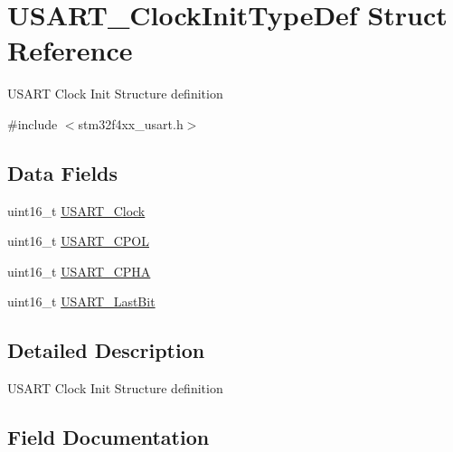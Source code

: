 \hypertarget{struct_u_s_a_r_t___clock_init_type_def}{}\section{U\+S\+A\+R\+T\+\_\+\+Clock\+Init\+Type\+Def Struct Reference}
\label{struct_u_s_a_r_t___clock_init_type_def}


U\+S\+A\+RT Clock Init Structure definition ~\newline
  




{\ttfamily \#include $<$stm32f4xx\+\_\+usart.\+h$>$}

\subsection*{Data Fields}
\begin{DoxyCompactItemize}
\item 
uint16\+\_\+t \mbox{\hyperlink{struct_u_s_a_r_t___clock_init_type_def_a17b0a201922d9d4bad57583b9766904a}{U\+S\+A\+R\+T\+\_\+\+Clock}}
\item 
uint16\+\_\+t \mbox{\hyperlink{struct_u_s_a_r_t___clock_init_type_def_ab6507c7489a2e05e4ef1ade9fbf057d5}{U\+S\+A\+R\+T\+\_\+\+C\+P\+OL}}
\item 
uint16\+\_\+t \mbox{\hyperlink{struct_u_s_a_r_t___clock_init_type_def_ae8d00e2e6f99439097a1b56cd33dd9f4}{U\+S\+A\+R\+T\+\_\+\+C\+P\+HA}}
\item 
uint16\+\_\+t \mbox{\hyperlink{struct_u_s_a_r_t___clock_init_type_def_a998735e29b6f77d3e993d8d34c74cbca}{U\+S\+A\+R\+T\+\_\+\+Last\+Bit}}
\end{DoxyCompactItemize}


\subsection{Detailed Description}
U\+S\+A\+RT Clock Init Structure definition ~\newline
 

\subsection{Field Documentation}
\mbox{\label{struct_u_s_a_r_t___clock_init_type_def_a17b0a201922d9d4bad57583b9766904a}} 
